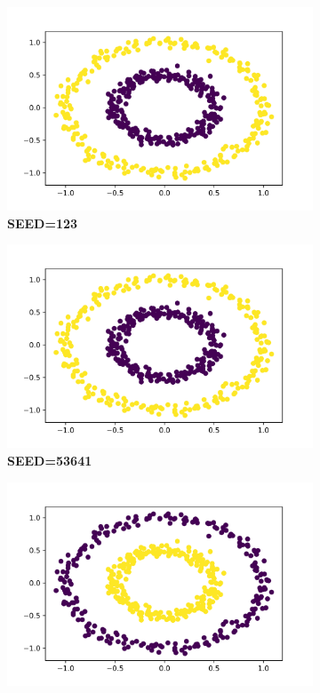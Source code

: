 \documentclass[11pt]{article}
\begin{document}
\begin{figure}[H]
    \begin{subfigure}{0.33\linewidth}
        \centering
        \includegraphics[width=1\linewidth]{kkm_123.png}
        \caption{\textbf{SEED=123}}
    \end{subfigure}%
    \begin{subfigure}{0.33\linewidth}
        \centering
        \includegraphics[width=1\linewidth]{kkm_53641.png}
        \caption{\textbf{SEED=53641}}
    \end{subfigure}%
    \begin{subfigure}{0.33\linewidth}
        \centering
        \includegraphics[width=1\linewidth]{kkm_87234.png}

\end{subfigure}
\end{figure}
\end{document}
